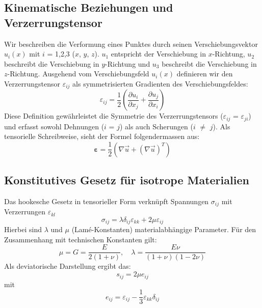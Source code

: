 \subsection{Kinematische Beziehungen und Verzerrungstensor}
Wir beschreiben die Verformung eines Punktes durch seinen Verschiebungsvektor $u_i(x)$ mit $i$ = 1,2,3 ($x$, $y$, $z$).
$u_1$ entspricht der Verschiebung in $x$-Richtung, $u_2$ beschreibt die Verschiebung in $y$-Richtung und $u_3$ beschreibt die Verschiebung in $z$-Richtung.
Ausgehend vom Verschiebungsfeld $u_i(x)$ definieren wir den Verzerrungstensor $\varepsilon_{ij}$ als symmetrisierten Gradienten des Verschiebungsfeldes:
\begin{equation}
	\varepsilon_{ij} = 
	\frac{1}{2} \left( \frac{\partial u_i}{\partial x_j} + \frac{\partial u_j}{\partial x_i} \right)
\end{equation}
Diese Definition gewährleistet die Symmetrie des Verzerrungstensors ($\varepsilon_{ij}$ = $\varepsilon_{ji}$) und erfasst sowohl Dehnungen ($i$ = $j$) als auch Scherungen ($i$ $\neq$ $j$).
Als tensorielle Schreibweise, sieht der Formel folgendermassen aus:
\begin{equation}
	\boldsymbol{\varepsilon} = 
	\frac{1}{2} \left( \nabla \vec{u} + (\nabla \vec{u})^T \right)
\end{equation}

\subsection{Konstitutives Gesetz für isotrope Materialien}
Das hookesche Gesetz in tensorieller Form verknüpft Spannungen $\sigma_{ij}$ mit Verzerrungen $\varepsilon_{kl}$
\begin{equation}
	\sigma_{ij} = 
	\lambda \delta_{ij} \varepsilon_{kk} + 2\mu \varepsilon_{ij}
\end{equation}
Hierbei sind $\lambda$ und $\mu$ (Lamé-Konstanten) materialabhängige Parameter. Für den Zusammenhang mit technischen Konstanten gilt:
\begin{equation}
	\mu = 
	G = 
	\frac{E}{2(1+\nu)}, \quad \lambda = 
	\frac{E \nu}{(1+\nu)(1-2\nu)}
\end{equation}	
Als deviatorische Darstellung ergibt das:
\begin{equation}
	s_{ij} =
	2\mu e_{ij}
\end{equation}
mit
\begin{equation}
	e_{ij} = 
	\varepsilon_{ij} - \frac{1}{3} \varepsilon_{kk} \delta_{ij}
\end{equation}


